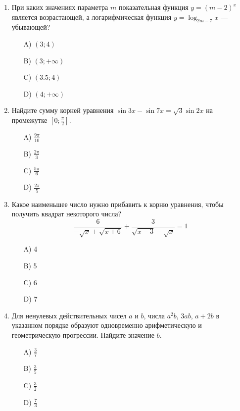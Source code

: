 \documentclass[12pt]{article}
\begin{document}
\begin{enumerate}
\vspace{0.cm} %

\item При каких значениях параметра \(m\) показательная функция \(y = (m - 2)^x\) является возрастающей, а логарифмическая функция \(y = \log_{2m-7}x\) — убывающей? \\
\textbf{}
\begin{enumerate}
    \item[A)] \((3; 4)\)
    \item[B)] \((3; +\infty)\)
    \item[C)] \((3.5; 4)\)
    \item[D)] \((4; +\infty)\)
\end{enumerate}

\vspace{0.cm} %

\item Найдите сумму корней уравнения \(\sin 3x - \sin 7x = \sqrt{3} \sin 2x\) на промежутке \([0; \frac{\pi}{2}]\). \\
\textbf{}
\begin{enumerate}
    \item[A)] \(\frac{9\pi}{10}\)
    \item[B)] \(\frac{2\pi}{3}\)
    \item[C)] \(\frac{5\pi}{6}\)
    \item[D)] \(\frac{2\pi}{5}\)
\end{enumerate}

\vspace{0.cm} %

\item Какое наименьшее число нужно прибавить к корню уравнения, чтобы получить квадрат некоторого числа?
\[
\frac{6}{-\sqrt{x} + \sqrt{x + 6}} + \frac{3}{\sqrt{x - 3} - \sqrt{x}} = 1
\]
\textbf{}
\begin{enumerate}
    \item[A)] 4
    \item[B)] 5
    \item[C)] 6
    \item[D)] 7
\end{enumerate}

\vspace{0.cm} %

\item Для ненулевых действительных чисел \(a\) и \(b\), числа \(a^2b\), \(3ab\), \(a + 2b\) в указанном порядке образуют одновременно арифметическую и геометрическую прогрессии. Найдите значение \(b\). \\
\textbf{}
\begin{enumerate}
    \item[A)] \(\frac{3}{7}\)
    \item[B)] \(\frac{3}{5}\)
    \item[C)] \(\frac{3}{2}\)
    \item[D)] \(\frac{7}{3}\)
\end{enumerate}


\end{enumerate}
\end{document}
